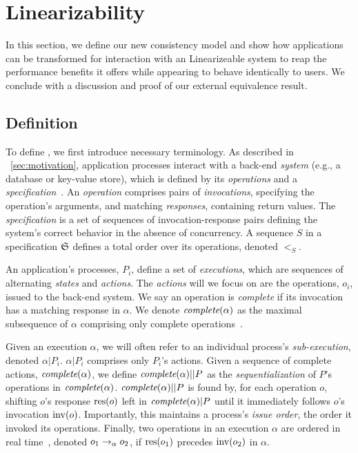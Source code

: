 \section{\Multidispatch{} Linearizability}
\label{sec:mdl}

In this section, we define our new consistency model and show how
applications can be transformed for interaction with an \multidispatch{} Linearizeable system to reap the performance benefits it offers while appearing to behave identically to users. We conclude with a discussion and proof of our external equivalence result.



\subsection{Definition}
\label{sec:mdl:def}


To define \mdl{}, we first introduce necessary terminology. As described in ~\ref{sec:motivation}, application processes interact with a back-end \textit{system} (e.g., a database or key-value store),
which is defined by its \textit{operations} and a
\textit{specification}~\cite{herlihy1990linearizability,lynch1996da}. An
\textit{operation} comprises pairs of \textit{invocations}, specifying the
operation's arguments, and matching \textit{responses}, containing
return values. The \textit{specification} is a
set of sequences of
invocation-response pairs defining the system's correct behavior in the absence
of concurrency. A sequence $S$ in a specification $\mathfrak{S}$ defines a total order
over its operations, denoted $<_S$.

An application's processes, $P_i$, define a set of \textit{executions},
which are sequences of alternating \textit{states} and
\textit{actions}. The \textit{actions} will we focus on are the operations, $o_i$, issued to the back-end system.
We say an
operation is \textit{complete} if its invocation has a matching response in
$\alpha$. We denote $\operatorname*{\textit{complete}}(\alpha)$ as the maximal subsequence of $\alpha$
comprising only complete operations~\cite{herlihy1990linearizability}. 

Given an execution $\alpha$, we will often refer to an individual process's
\textit{sub-execution}, denoted $\alpha|P_i$. $\alpha|P_i$ comprises
only $P_i$'s actions. Given a sequence of complete actions,
$\operatorname*{\textit{complete}}(\alpha)$, we define $\operatorname*{\textit{complete}}(\alpha)||P$ as the
\textit{sequentialization} of $P$'s operations in $\operatorname*{\textit{complete}}(\alpha)$.
$\operatorname*{\textit{complete}}(\alpha)||P$ is found by, for each operation $o$, shifting $o$'s response
$\operatorname{res}(o)$ left in $\operatorname*{\textit{complete}}(\alpha)|P$ until it immediately follows $o$'s
invocation $\operatorname{inv}(o)$.
Importantly, this maintains a process's
\textit{issue order}, the order it invoked its operations. 
Finally, two operations in an execution $\alpha$ are
ordered in real time~\cite{herlihy1990linearizability}, denoted
$o_1 \rightarrow_\alpha o_2$, if $\operatorname{res}(o_1)$ precedes $\operatorname{inv}(o_2)$ in $\alpha$. 

